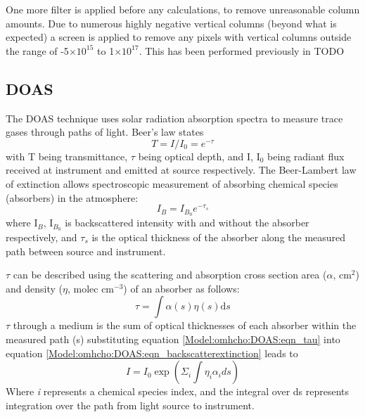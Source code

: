   One more filter is applied before any calculations, to remove unreasonable column amounts.
  Due to numerous highly negative vertical columns (beyond what is expected) a screen is applied to remove any pixels with vertical columns outside the range of -5$\times 10^{15}$ to 1$\times 10^{17}$.
  This has been performed previously in TODO %
  
  \subsection{DOAS}
    \label{Model:omhcho:DOAS}
    
    The DOAS technique uses solar radiation absorption spectra to measure trace gases through paths of light.
    Beer's law states
    \begin{equation} \label{Model:omhcho:DOAS:eqn_beerslaw}
    T = I/I_0 = e^{-\tau}
    \end{equation}
    with T being transmittance, $\tau$ being optical depth, and I, I$_0$ being radiant flux received at instrument and emitted at source respectively.
    The Beer-Lambert law of extinction allows spectroscopic measurement of absorbing chemical species (absorbers) in the atmosphere:
    \begin{equation} \label{Model:omhcho:DOAS:eqn_backscatterextinction}
    I_B = I_{B_0} e^{-\tau_s}
    \end{equation}
    where I$_B$, I$_{B_0}$ is backscattered intensity with and without the absorber respectively, and $\tau_s$ is the optical thickness of the absorber along the measured path between source and instrument.
    
    $\tau$ can be described using the scattering and absorption cross section area ($\alpha$, cm$^{2}$) and density ($\eta$, molec cm$^{-3}$) of an absorber as follows:
    \begin{equation} \label{Model:omhcho:DOAS:eqn_tau}
    \tau = \int \alpha(s) \eta(s) \mathrm{d}s
    \end{equation}
    $\tau$ through a medium is the sum of optical thicknesses of each absorber within the measured path (s)
    substituting equation \ref{Model:omhcho:DOAS:eqn_tau} into equation \ref{Model:omhcho:DOAS:eqn_backscatterextinction} leads to
    \begin{equation*}
      I = I_0 \exp { \left( \Sigma_i \int \eta_i \alpha_i ds \right) }
    \end{equation*}
    Where \textit{i} represents a chemical species index, and the integral over ds represents integration over the path from light source to instrument.
    
